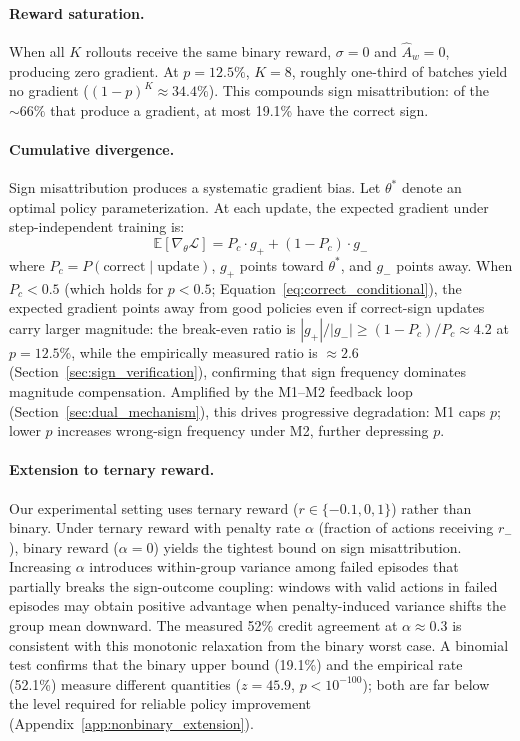 \paragraph{Reward saturation.} When all $K$ rollouts receive the same binary reward, $\sigma = 0$ and $\hat{A}_w = 0$, producing zero gradient. At $p{=}12.5\%$, $K{=}8$, roughly one-third of batches yield no gradient ($(1{-}p)^K \approx 34.4\%$). This compounds sign misattribution: of the ${\sim}66\%$ that produce a gradient, at most 19.1\% have the correct sign.

\paragraph{Cumulative divergence.} Sign misattribution produces a systematic gradient bias. Let $\theta^*$ denote an optimal policy parameterization. At each update, the expected gradient under step-independent training is:
\begin{equation}
\mathbb{E}[\nabla_\theta \mathcal{L}] = P_c \cdot g_+ + (1 - P_c) \cdot g_-
\label{eq:biased_gradient}
\end{equation}
where $P_c = P(\text{correct} \mid \text{update})$, $g_+$ points toward $\theta^*$, and $g_-$ points away. When $P_c < 0.5$ (which holds for $p < 0.5$; Equation~\ref{eq:correct_conditional}), the expected gradient points away from good policies even if correct-sign updates carry larger magnitude: the break-even ratio is $|g_+|/|g_-| \geq (1{-}P_c)/P_c \approx 4.2$ at $p{=}12.5\%$, while the empirically measured ratio is ${\approx}2.6$ (Section~\ref{sec:sign_verification}), confirming that sign frequency dominates magnitude compensation. Amplified by the M1--M2 feedback loop (Section~\ref{sec:dual_mechanism}), this drives progressive degradation: M1 caps $p$; lower $p$ increases wrong-sign frequency under M2, further depressing $p$.

\paragraph{Extension to ternary reward.} Our experimental setting uses ternary reward ($r \in \{-0.1, 0, 1\}$) rather than binary. Under ternary reward with penalty rate $\alpha$ (fraction of actions receiving $r_-$), binary reward ($\alpha{=}0$) yields the tightest bound on sign misattribution. Increasing $\alpha$ introduces within-group variance among failed episodes that partially breaks the sign-outcome coupling: windows with valid actions in failed episodes may obtain positive advantage when penalty-induced variance shifts the group mean downward. The measured 52\% credit agreement at $\alpha{\approx}0.3$ is consistent with this monotonic relaxation from the binary worst case. A binomial test confirms that the binary upper bound (19.1\%) and the empirical rate (52.1\%) measure different quantities ($z = 45.9$, $p < 10^{-100}$); both are far below the level required for reliable policy improvement (Appendix~\ref{app:nonbinary_extension}).
